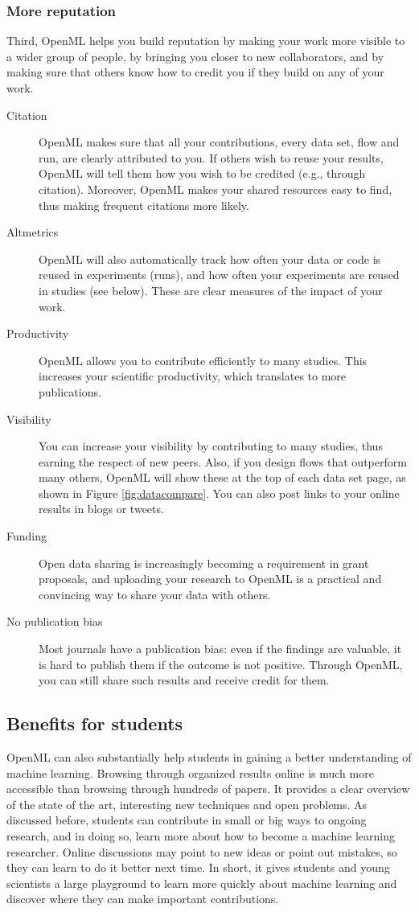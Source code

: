 \documentclass{acmproc-sp}
\begin{document}
\subsubsection{More reputation}
Third, OpenML helps you build reputation by making your work more visible to a wider group of people, by bringing you closer to new collaborators, and by making sure that others know how to credit you if they build on any of your work.
\begin{description}%
\item[Citation] OpenML makes sure that all your contributions, every data set, flow and run, are clearly attributed to you. If others wish to reuse your results, OpenML will tell them how you wish to be credited (e.g., through citation). Moreover, OpenML makes your shared resources easy to find, thus making frequent citations more likely.
\item[Altmetrics] OpenML will also automatically track how often your data or code is reused in experiments (runs), and how often your experiments are reused in studies (see below). These are clear measures of the impact of your work.
\item[Productivity] OpenML allows you to contribute efficiently to many studies. This increases your scientific productivity, which translates to more publications.
\item[Visibility] You can increase your visibility by contributing to many studies, thus earning the respect of new peers. Also, if you design flows that outperform many others, OpenML will show these at the top of each data set page, as shown in Figure \ref{fig:datacompare}. You can also post links to your online results in blogs or tweets. 
\item[Funding] Open data sharing is increasingly becoming a requirement in grant proposals, and uploading your research to OpenML is a practical and convincing way to share your data with others.
\item[No publication bias] Most journals have a publication bias: even if the findings are valuable, it is hard to publish them if the outcome is not positive. Through OpenML, you can still share such results and receive credit for them.
\end{description}

\subsection{Benefits for students}
OpenML can also substantially help students in gaining a better understanding of machine learning. 
Browsing through organized results online is much more accessible than browsing through hundreds of papers. It provides a clear overview of the state of the art, interesting new techniques and open problems. As discussed before, students can contribute in small or big ways to ongoing research, and in doing so, learn more about how to become a machine learning researcher. Online discussions may point to new ideas or point out mistakes, so they can learn to do it better next time. In short, it gives students and young scientists a large playground to learn more quickly about machine learning and discover where they can make important contributions.
\end{document}
